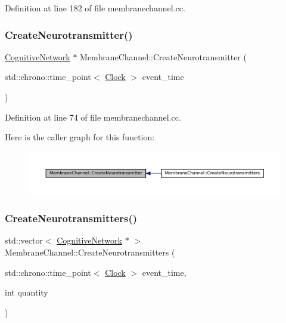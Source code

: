 Definition at line 182 of file membranechannel.\+cc.

\mbox{\label{class_membrane_channel_aa8e78a1b0dd7c6b81cac09d33f01e6c2}} 
\subsubsection{\texorpdfstring{Create\+Neurotransmitter()}{CreateNeurotransmitter()}}
{\footnotesize\ttfamily \mbox{\hyperlink{class_cognitive_network}{Cognitive\+Network}} $\ast$ Membrane\+Channel\+::\+Create\+Neurotransmitter (\begin{DoxyParamCaption}\item[{std\+::chrono\+::time\+\_\+point$<$ \mbox{\hyperlink{universe_8h_a0ef8d951d1ca5ab3cfaf7ab4c7a6fd80}{Clock}} $>$}]{event\+\_\+time }\end{DoxyParamCaption})}



Definition at line 74 of file membranechannel.\+cc.

Here is the caller graph for this function\+:\nopagebreak
\begin{figure}[H]
\begin{center}
\leavevmode
\includegraphics[width=350pt]{class_membrane_channel_aa8e78a1b0dd7c6b81cac09d33f01e6c2_icgraph}
\end{center}
\end{figure}
\mbox{\label{class_membrane_channel_a24c791e6cfd906d49e0ceb8a24eeb4cb}} 
\subsubsection{\texorpdfstring{Create\+Neurotransmitters()}{CreateNeurotransmitters()}}
{\footnotesize\ttfamily std\+::vector$<$ \mbox{\hyperlink{class_cognitive_network}{Cognitive\+Network}} $\ast$ $>$ Membrane\+Channel\+::\+Create\+Neurotransmitters (\begin{DoxyParamCaption}\item[{std\+::chrono\+::time\+\_\+point$<$ \mbox{\hyperlink{universe_8h_a0ef8d951d1ca5ab3cfaf7ab4c7a6fd80}{Clock}} $>$}]{event\+\_\+time,  }\item[{int}]{quantity }\end{DoxyParamCaption})}



